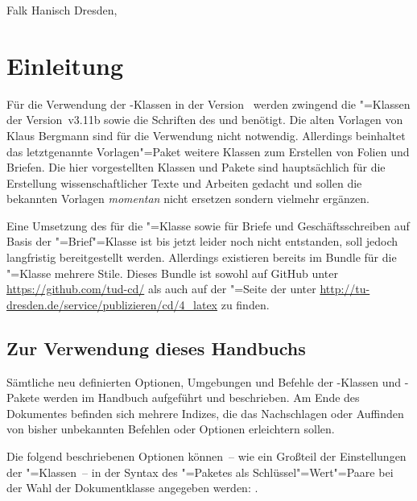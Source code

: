 \documentclass[%
  english,ngerman,%
  headings=optiontoheadandtoc,captions=tableheading,numbers=noenddot,%
  chapterpage,cdfoot,%
]{tudscrman}
\newcommand*\vKOMA{v3.11b}
\begin{document}
\makeatletter
\bigskip
\noindent Falk Hanisch\newline
Dresden, \@@date
\makeatother

\tableofcontents



\chapter{Einleitung}
Für die Verwendung der \TUDScript-Klassen in der Version~\vTUDScript{} werden 
zwingend die \KOMAScript"=Klassen der Version~\vKOMA{} sowie die Schriften des 
\CDs \Univers und \DIN benötigt. Die alten Vorlagen von Klaus Bergmann sind für 
die Verwendung nicht notwendig. Allerdings beinhaltet das letztgenannte 
Vorlagen"=Paket weitere Klassen zum Erstellen von Folien und Briefen. Die hier 
vorgestellten Klassen und Pakete sind hauptsächlich für die Erstellung 
wissenschaftlicher Texte und Arbeiten gedacht und sollen die bekannten Vorlagen 
\emph{momentan} nicht ersetzen sondern vielmehr ergänzen. 

Eine Umsetzung des \CDs für die "=Klasse sowie für Briefe und 
Geschäftsschreiben auf Basis der \KOMAScript"=Brief"=Klasse  
ist bis jetzt leider noch nicht entstanden, soll jedoch langfristig 
bereitgestellt werden. Allerdings existieren bereits im Bundle 
 für die "=Klasse mehrere Stile. Dieses 
Bundle ist sowohl auf \mbox{GitHub} unter \url{https://github.com/tud-cd/} als 
auch auf der "=Seite der \TnUD unter
\url{http://tu-dresden.de/service/publizieren/cd/4_latex} zu finden.


\section{Zur Verwendung dieses Handbuchs}
Sämtliche neu definierten Optionen, Umgebungen und Befehle der 
\TUDScript-Klassen und \TUDScript-Pakete werden im Handbuch aufgeführt und 
beschrieben. Am Ende des Dokumentes befinden sich mehrere Indizes, die das 
Nachschlagen oder Auffinden von bisher unbekannten Befehlen oder Optionen 
erleichtern sollen.

Die folgend beschriebenen Optionen können~-- wie ein Großteil der Einstellungen 
der \KOMAScript"=Klassen~-- in der Syntax des "=Paketes als 
Schlüssel"=Wert"=Paare bei der Wahl der Dokumentklasse angegeben werden:
%
.
\end{document}
